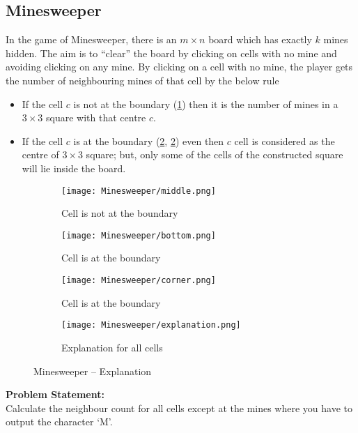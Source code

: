 \documentclass[../../Problems]{subfiles}
\begin{document}
\subsection{Minesweeper}
In the game of Minesweeper, there is an $m\times n$ board which has exactly $k$ mines hidden. The aim is to ``clear'' the board by clicking on cells with no mine and avoiding clicking on any mine. By clicking on a cell with no mine, the player gets the number of neighbouring mines of that cell by the below rule
\begin{itemize}	
	\item If the cell $c$ is not at the boundary (\ref{fig:minecnb}) then it is the number of mines in a $3\times3$ square with that centre $c$.
	\item If the cell $c$ is at the boundary (\ref{fig:minecb1}, \ref{fig:minecb1}) even then $c$ cell is considered as the centre of $3\times3$ square; but, only some of the cells of the constructed square will lie inside the board.
\end{itemize}
\begin{figure}[H]
	\centering
	\begin{subfigure}[t]{0.25\linewidth}
		\centering
		\texttt{[image: Minesweeper/middle.png]}
		\caption{Cell is not at the boundary}
		\label{fig:minecnb}
	\end{subfigure}
	\begin{subfigure}[t]{0.22\linewidth}
		\centering
		\texttt{[image: Minesweeper/bottom.png]}
		\caption{Cell is at the boundary}
		\label{fig:minecb1}
	\end{subfigure}
	\begin{subfigure}[t]{0.22\linewidth}
		\centering
		\texttt{[image: Minesweeper/corner.png]}
		\caption{Cell is at the boundary}
		\label{fig:minecb2}
	\end{subfigure}
	\begin{subfigure}[t]{0.22\linewidth}
		\centering
		\texttt{[image: Minesweeper/explanation.png]}
		\caption{Explanation for all cells}
		\label{fig:minee}
	\end{subfigure}
	\caption{Minesweeper -- Explanation}
\end{figure}
\vspace{-2em}
\textbf{Problem Statement:}\\
Calculate the neighbour count for all cells except at the mines where you have to output the character `M'.%
\end{document}
